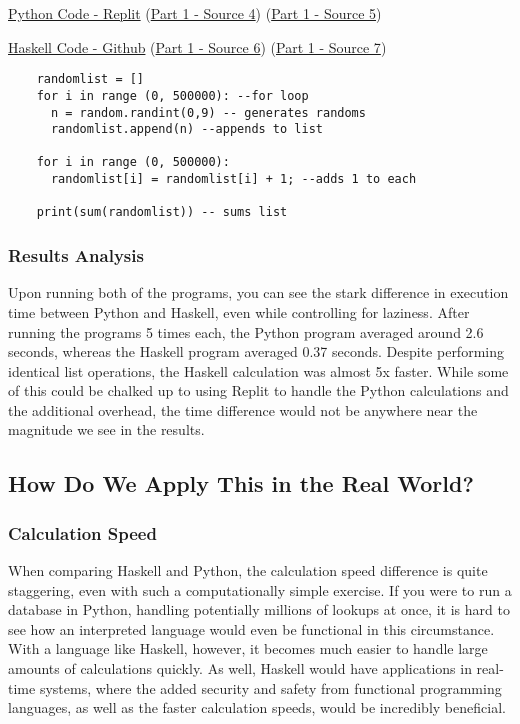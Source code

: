 \documentclass{article}
\begin{document}
 \medskip\href{https://replit.com/@ErikHombledal/PaperExamplePython#main.py} {Python Code - Replit} (\href{https://www.tutorialspoint.com/generating-random-number-list-in-python}{Part 1 - Source 4}) (\href{https://stackoverflow.com/questions/1557571/how-do-i-get-time-of-a-python-programs-execution} {Part 1 - Source 5})
 
 \medskip\href{https://github.com/ehombledal/ProgLang354/blob/main/Report/Part1/HaskellPaperExample.hs} {Haskell Code - Github}
 (\href{https://stackoverflow.com/questions/30994484/haskell-generate-and-use-the-same-random-list}{Part 1 - Source 6})
 (\href{https://stackoverflow.com/questions/5968614/how-to-get-a-programs-running-time-in-haskell}{Part 1 - Source 7})
 
     \begin{lstlisting}
    randomlist = []
    for i in range (0, 500000): --for loop
      n = random.randint(0,9) -- generates randoms
      randomlist.append(n) --appends to list
    
    for i in range (0, 500000):
      randomlist[i] = randomlist[i] + 1; --adds 1 to each
    
    print(sum(randomlist)) -- sums list

    \end{lstlisting}
 

    \subsubsection{Results Analysis}
    \medskip\noindent Upon running both of the programs, you can see the stark difference in execution time between Python and Haskell, even while controlling for laziness. After running the programs 5 times each, the Python program averaged around 2.6 seconds, whereas the Haskell program averaged 0.37 seconds. Despite performing identical list operations, the Haskell calculation was almost 5x faster. While some of this could be chalked up to using Replit to handle the Python calculations and the additional overhead, the time difference would not be anywhere near the magnitude we see in the results. 
    
    \subsection{How Do We Apply This in the Real World?}
        \subsubsection{Calculation Speed}
        When comparing Haskell and Python, the calculation speed difference is quite staggering, even with such a computationally simple exercise. If you were to run a database in Python, handling potentially millions of lookups at once, it is hard to see how an interpreted language would even be functional in this circumstance. With a language like Haskell, however, it becomes much easier to handle large amounts of calculations quickly. As well, Haskell would have applications in real-time systems, where the added security and safety from functional programming languages, as well as the faster calculation speeds, would be incredibly beneficial. 
\end{document}
